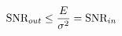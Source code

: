 \documentclass[preview]{standalone}
\begin{document}
\begin{align*}
\special{dvisvgm:raw <g id='unique000'>}\text{SNR}_{out}\leq\frac{E}{\sigma^2}=\text{SNR}_{in}\special{dvisvgm:raw </g>}
\end{align*}
\end{document}
